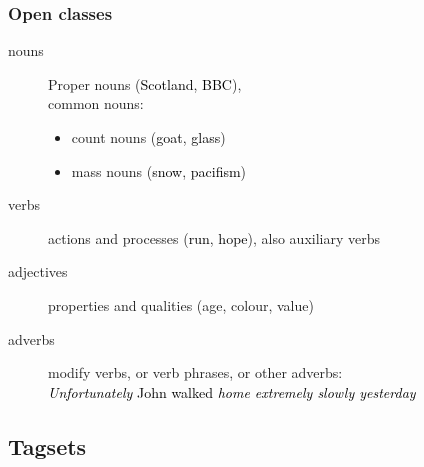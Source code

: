 \documentclass{beamer}             %
\begin{document}
\begin{frame}
  \frametitle{Open classes}
  \begin{description}
  \item[nouns] Proper nouns (\textcolor{black}{Scotland}, \textcolor{black}{BBC}),\\
    common nouns:
    \begin{itemize}
    \item count nouns (\textcolor{black}{goat},
      \textcolor{black}{glass})
    \item mass nouns (\textcolor{black}{snow},
      \textcolor{black}{pacifism})
    \end{itemize}
  \item[verbs] actions and processes (\textcolor{black}{run},
    \textcolor{black}{hope}), also auxiliary verbs
  \item[adjectives] properties and qualities (age, colour, value)
  \item[adverbs] modify verbs, or verb phrases, or other adverbs:\\
    \textcolor{black}{\emph{Unfortunately} John walked \emph{home
        extremely slowly yesterday}}
  \end{description}
\end{frame}


\subsection{Tagsets}
\end{document}
